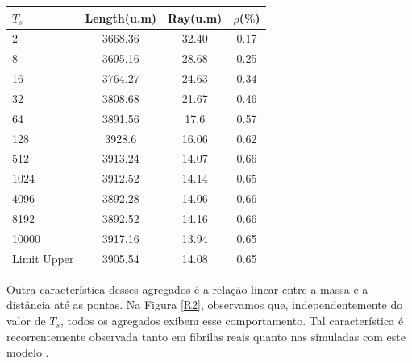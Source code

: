\documentclass{report}
\begin{document}
\begin{table}[H]
            \centering  %
            \begin{tabular}{lccc}
            \hline
            \textbf{$T_{s}$} & \multicolumn{1}{c}{\textbf{Length(u.m)}} & \textbf{Ray(u.m)} & \textbf{\(\rho\)(\%)} \\ \hline
            2                & 3668.36                                   & 32.40             & 0.17                  \\
            8                & 3695.16                                   & 28.68             & 0.25                  \\
            16               & 3764.27                                   & 24.63             & 0.34                  \\
            32               & 3808.68                                   & 21.67             & 0.46                  \\
            64               & 3891.56                                   & 17.6              & 0.57                  \\
            128              & 3928.6                                    & 16.06             & 0.62                  \\
            512              & 3913.24                                   & 14.07             & 0.66                  \\
            1024             & 3912.52                                   & 14.14             & 0.65                  \\
            4096             & 3892.28                                   & 14.06             & 0.66                  \\
            8192             & 3892.52                                   & 14.16             & 0.66                  \\
            10000            & 3917.16                                   & 13.94             & 0.65                  \\ \hline
            \multicolumn{1}{l}{Limit Upper} & 3905.54                    & 14.08             & 0.65                  \\ \hline
            \end{tabular}
            \label{tab1}  %
        \end{table}
    
    
        Outra característica desses agregados é a relação linear entre a massa e a distância até as pontas. Na Figura 
        \ref{R2}, observamos que, independentemente do valor de \(T_{s}\), todos os agregados exibem esse comportamento. 
        Tal característica é recorrentemente observada tanto em fibrilas reais quanto nas simuladas com este modelo 
        \cite{Parkinson1995,Kadler1987}. 
    
\end{document}
